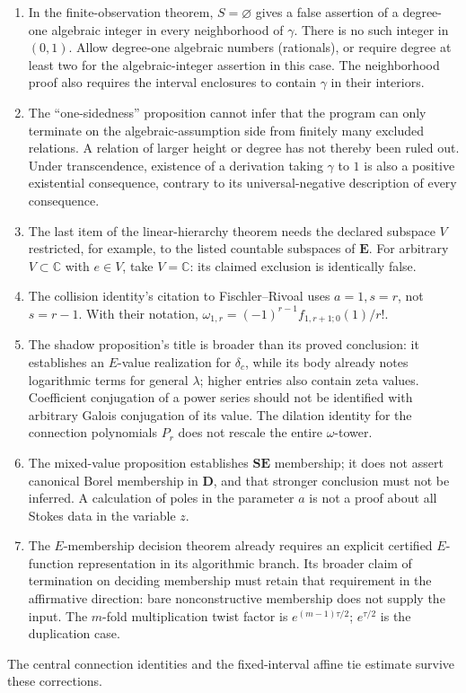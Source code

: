 \documentclass[11pt,a4paper]{article}
\newcommand{\C}{\mathbb C}
\newcommand{\E}{\mathbf E}
\theoremstyle{definition}
\theoremstyle{remark}
\theoremstyle{plain}
\numberwithin{equation}{section}
\begin{document}
\begin{enumerate}[leftmargin=*,itemsep=3pt]
\item In the finite-observation theorem, $S=\varnothing$ gives a false assertion of a degree-one algebraic integer in every neighborhood of $\gamma$. There is no such integer in $(0,1)$. Allow degree-one algebraic numbers (rationals), or require degree at least two for the algebraic-integer assertion in this case. The neighborhood proof also requires the interval enclosures to contain $\gamma$ in their interiors.
\item The ``one-sidedness'' proposition cannot infer that the program can only terminate on the algebraic-assumption side from finitely many excluded relations. A relation of larger height or degree has not thereby been ruled out. Under transcendence, existence of a derivation taking $\gamma$ to $1$ is also a positive existential consequence, contrary to its universal-negative description of every consequence.
\item The last item of the linear-hierarchy theorem needs the declared subspace $V$ restricted, for example, to the listed countable subspaces of $\E$. For arbitrary $V\subset\C$ with $e\in V$, take $V=\C$: its claimed exclusion is identically false.
\item The collision identity's citation to Fischler--Rivoal uses $a=1,s=r$, not $s=r-1$. With their notation, $\omega_{1,r}=(-1)^{r-1}f_{1,r+1;0}(1)/r!$.
\item The shadow proposition's title is broader than its proved conclusion: it establishes an $E$-value realization for $\delta_c$, while its body already notes logarithmic terms for general $\lambda$; higher entries also contain zeta values. Coefficient conjugation of a power series should not be identified with arbitrary Galois conjugation of its value. The dilation identity for the connection polynomials $P_r$ does not rescale the entire $\omega$-tower.
\item The mixed-value proposition establishes $\mathbf S\mathbf E$ membership; it does not assert canonical Borel membership in $\mathbf D$, and that stronger conclusion must not be inferred. A calculation of poles in the parameter $a$ is not a proof about all Stokes data in the variable $z$.
\item The $E$-membership decision theorem already requires an explicit certified $E$-function representation in its algorithmic branch. Its broader claim of termination on deciding membership must retain that requirement in the affirmative direction: bare nonconstructive membership does not supply the input. The $m$-fold multiplication twist factor is $e^{(m-1)\tau/2}$; $e^{\tau/2}$ is the duplication case.
\end{enumerate}
The central connection identities and the fixed-interval affine tie estimate survive these corrections.
\end{document}
